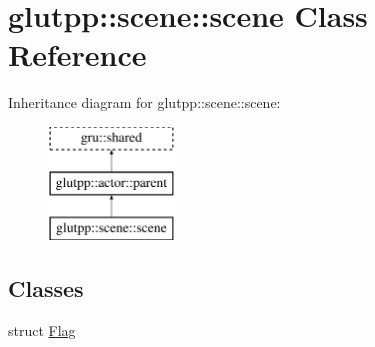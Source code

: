 \hypertarget{classglutpp_1_1scene_1_1scene}{\section{glutpp\-:\-:scene\-:\-:scene \-Class \-Reference}
\label{classglutpp_1_1scene_1_1scene}
}
\-Inheritance diagram for glutpp\-:\-:scene\-:\-:scene\-:\begin{figure}[H]
\begin{center}
\leavevmode
\includegraphics[height=3.000000cm]{classglutpp_1_1scene_1_1scene}
\end{center}
\end{figure}
\subsection*{\-Classes}
\begin{DoxyCompactItemize}
\item 
struct \hyperlink{structglutpp_1_1scene_1_1scene_1_1Flag}{\-Flag}
\end{DoxyCompactItemize}
